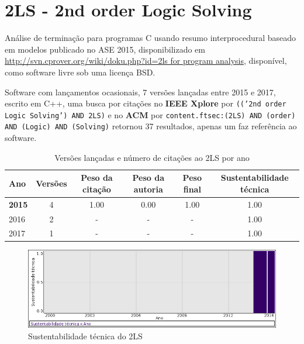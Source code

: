 
%

\label{softwares-summary}

\section{2LS - 2nd order Logic Solving}

Análise de terminação para programas C usando resumo interprocedural baseado em modelos
publicado no ASE 2015,
disponibilizado em \url{http://svn.cprover.org/wiki/doku.php?id=2ls for program analysis},
disponível,
como software livre
sob uma licença BSD.

Software com lançamentos ocasionais,
7 versões lançadas
entre 2015 e 2017,
escrito em C++,
uma busca por citações no {\bf IEEE Xplore} por
\texttt{(('2nd order Logic Solving') AND 2LS)}
e no {\bf ACM} por
\texttt{content.ftsec:(2LS) AND (order) AND (Logic) AND (Solving)}
retornou
37 resultados,
apenas um faz referência ao software.


\begin{table}[H]
\caption{Versões lançadas e número de citações ao 2LS por ano}
\centering
\begin{tabular}{| l | c | c | c | c | c |}
  \hline
  Ano & Versões & Peso da citação & Peso da autoria & Peso final & Sustentabilidade técnica \\
  \hline
            {\bf 2015}
          &
          4
          &
          1.00
          &
          0.00
          &
          1.00
          &
            {\color{blue} 1.00}
          \\
\hline
        2016 & 2 & - & - & -
        &
          {\color{blue} 1.00}
        \\
\hline
        2017 & 1 & - & - & -
        &
          {\color{blue} 1.00}
        \\
\hline
\end{tabular}
\end{table}

\begin{figure}[h]
  \center
  \includegraphics[scale=0.50]{result-documents/charts/2ls.png}
  \caption{Sustentabilidade técnica do 2LS}
\end{figure}


